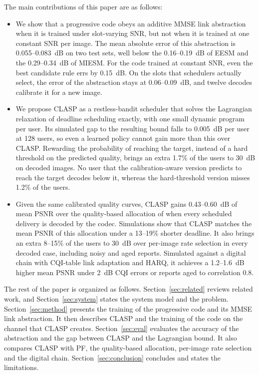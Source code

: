 The main contributions of this paper are as follows:
\begin{itemize}
\item We show that a progressive code obeys an additive MMSE link abstraction when it is trained
under slot-varying SNR, but not when it is trained at one constant SNR per image. The mean absolute
error of this abstraction is 0.055--0.083~dB on two test sets, well below the 0.16--0.19~dB of EESM
and the 0.29--0.34~dB of MIESM. For the code trained at constant SNR, even the best candidate rule
errs by 0.15~dB. On the slots that schedulers actually select, the error of the abstraction stays at
0.06--0.09~dB, and twelve decodes calibrate it for a new image.
\item We propose CLASP as a restless-bandit scheduler that solves the Lagrangian relaxation of
deadline scheduling exactly, with one small dynamic program per user. Its simulated gap to the
resulting bound falls to 0.005~dB per user at 128 users, so even a learned policy cannot gain more
than this over CLASP. Rewarding the probability of reaching the target, instead of a hard threshold
on the predicted quality, brings an extra 1.7\% of the users to 30~dB on decoded images. No user that
the calibration-aware version predicts to reach the target decodes below it, whereas the
hard-threshold version misses 1.2\% of the users.
\item Given the same calibrated quality curves, CLASP gains 0.43--0.60~dB of mean PSNR over the
quality-based allocation of \cite{Yan22,Xia24,Hou26} when every scheduled delivery is decoded by
the codec. Simulations show that CLASP matches the mean PSNR of this allocation under a
\mbox{13--19\%} shorter deadline. It also brings an extra 8--15\% of the users to 30~dB over per-image rate
selection \cite{Zhang23} in every decoded case, including noisy and aged reports. Simulated against
a digital chain with CQI-table link adaptation and HARQ, it achieves a 1.2--1.6~dB higher mean PSNR
under 2~dB CQI errors or reports aged to correlation 0.8.
\end{itemize}

The rest of the paper is organized as follows. Section~\ref{sec:related} reviews related work, and
Section~\ref{sec:system} states the system model and the problem. Section~\ref{sec:method} presents
the training of the progressive code and its MMSE link abstraction. It then describes CLASP and the
training of the code on the channel that CLASP creates. Section~\ref{sec:eval} evaluates the
accuracy of the abstraction and the gap between CLASP and the Lagrangian bound. It also compares
CLASP with PF, the quality-based allocation, per-image rate selection and the digital chain.
Section~\ref{sec:conclusion} concludes and states the limitations.
